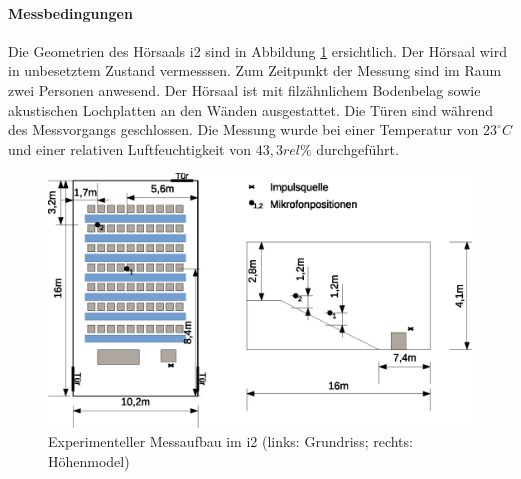 \documentclass[11pt]{report}
\begin{document}
\paragraph{Messbedingungen}
Die Geometrien des H\"orsaals i2 sind in Abbildung \ref{fig:i2geometrics} ersichtlich. Der H\"orsaal wird in unbesetztem Zustand vermesssen. Zum Zeitpunkt der Messung sind im Raum zwei Personen anwesend. Der H\"orsaal ist mit filz\"ahnlichem Bodenbelag sowie akustischen Lochplatten an den W\"anden ausgestattet. Die T\"uren sind w\"ahrend des Messvorgangs geschlossen. Die Messung wurde bei einer Temperatur von $23^\circ C$ und einer relativen Luftfeuchtigkeit von $43,3rel\%$ durchgef\"uhrt. 
\begin{figure}[htbp]
\begin{center}
\includegraphics[width=14cm,keepaspectratio=true]{i2}
\caption{Experimenteller Messaufbau im i2 (links: Grundriss; rechts: H\"ohenmodel)}
\label{fig:i2geometrics}
\end{center}
\end{figure}

\end{document}
